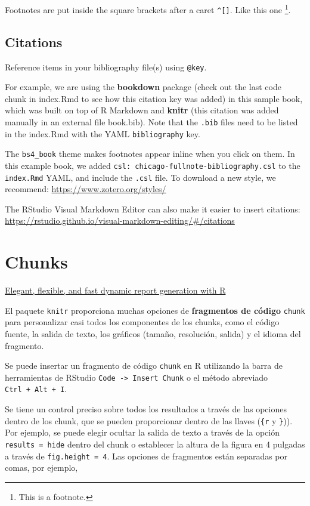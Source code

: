 \documentclass[
]{book}
\begin{document}
Footnotes are put inside the square brackets after a caret \texttt{\^{}{[}{]}}. Like this one \footnote{This is a footnote.}.

\hypertarget{citations}{%
\section{Citations}\label{citations}}

Reference items in your bibliography file(s) using \texttt{@key}.

For example, we are using the \textbf{bookdown} package \citep{R-bookdown} (check out the last code chunk in index.Rmd to see how this citation key was added) in this sample book, which was built on top of R Markdown and \textbf{knitr} \citep{xie2015} (this citation was added manually in an external file book.bib).
Note that the \texttt{.bib} files need to be listed in the index.Rmd with the YAML \texttt{bibliography} key.

The \texttt{bs4\_book} theme makes footnotes appear inline when you click on them. In this example book, we added \texttt{csl:\ chicago-fullnote-bibliography.csl} to the \texttt{index.Rmd} YAML, and include the \texttt{.csl} file. To download a new style, we recommend: \url{https://www.zotero.org/styles/}

The RStudio Visual Markdown Editor can also make it easier to insert citations: \url{https://rstudio.github.io/visual-markdown-editing/\#/citations}

\hypertarget{chunks}{%
\chapter{Chunks}\label{chunks}}

\href{https://yihui.org/knitr/}{Elegant, flexible, and fast dynamic report generation with R}

El paquete \texttt{knitr} proporciona muchas opciones de \textbf{fragmentos de código} \texttt{chunk} para personalizar casi todos los componentes de los chunks, como el código fuente, la salida de texto, los gráficos (tamaño, resolución, salida) y el idioma del fragmento.

Se puede insertar un fragmento de código \texttt{chunk} en R utilizando la barra de herramientas de RStudio \texttt{Code\ -\textgreater{}\ Insert\ Chunk} o el método abreviado \texttt{Ctrl\ +\ Alt\ +\ I}.

Se tiene un control preciso sobre todos los resultados a través de las opciones dentro de los chunk, que se pueden proporcionar dentro de las llaves (\texttt{\textasciigrave{}\textasciigrave{}\textasciigrave{}\{r} y \texttt{\}})). Por ejemplo, se puede elegir ocultar la salida de texto a través de la opción \texttt{results\ =\ \textquotesingle{}hide\textquotesingle{}} dentro del chunk o establecer la altura de la figura en 4 pulgadas a través de \texttt{fig.height\ =\ 4}. Las opciones de fragmentos están separadas por comas, por ejemplo,
\end{document}
